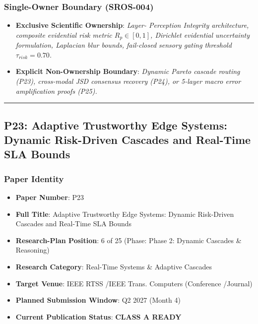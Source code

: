 \documentclass[11pt,letterpaper]{article}
\begin{document}
\subsubsection{Single-Owner Boundary (SROS-004)}
\begin{itemize}[leftmargin=*]
    \item \textbf{Exclusive Scientific Ownership}: \textit{Layer- Perception Integrity architecture, composite evidential risk metric $R_p \in [0,1]$, Dirichlet evidential uncertainty formulation, Laplacian blur bounds, fail-\allowbreak closed sensory gating threshold $\tau_{risk}=0.70$.}
    \item \textbf{Explicit Non-Ownership Boundary}: \textit{Dynamic Pareto cascade routing (P23), cross-\allowbreak modal JSD consensus recovery (P24), or 5-\allowbreak layer macro error amplification proofs (P25).}
\end{itemize}

\vspace{0.4cm}
\hrule

\subsection{P23: Adaptive Trustworthy Edge Systems: Dynamic Risk-\allowbreak Driven Cascades and Real-\allowbreak Time SLA Bounds}
\label{sec:profile_p23}

\subsubsection{Paper Identity}
\begin{itemize}[leftmargin=*]
    \item \textbf{Paper Number}: P23
    \item \textbf{Full Title}: Adaptive Trustworthy Edge Systems: Dynamic Risk-\allowbreak Driven Cascades and Real-\allowbreak Time SLA Bounds
    \item \textbf{Research-Plan Position}: 6 of 25 (Phase: Phase 2: Dynamic Cascades \& Reasoning)
    \item \textbf{Research Category}: Real-\allowbreak Time Systems \& Adaptive Cascades
    \item \textbf{Target Venue}: IEEE RTSS /\allowbreak  IEEE Trans. Computers (Conference /\allowbreak  Journal)
    \item \textbf{Planned Submission Window}: Q2 2027 (Month 4)
    \item \textbf{Current Publication Status}: \textbf{CLASS A READY}
\end{itemize}
\end{document}
